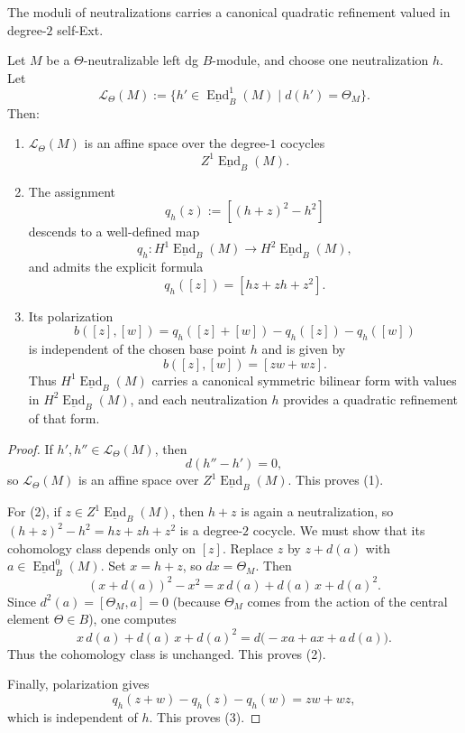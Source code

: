 The moduli of neutralizations carries a canonical quadratic refinement valued in degree-\(2\) self-Ext.

\begin{theorem}
\label{thm:tholog-quadratic-refinement}
Let \(M\) be a \(\Theta\)-neutralizable left dg \(B\)-module, and choose one neutralization \(h\).
Let
\[
\mathcal{L}_{\Theta}(M)
:=
\big\{
h'\in \underline{\operatorname{End}}^{1}_{B}(M)\;\big|\;
d(h')=\Theta_{M}
\big\}.
\]
Then:
\begin{enumerate}
\item \(\mathcal{L}_{\Theta}(M)\) is an affine space over the degree-\(1\) cocycles
\[
Z^{1}\underline{\operatorname{End}}_{B}(M).
\]
\item The assignment
\[
q_{h}(z):=[(h+z)^{2}-h^{2}]
\]
descends to a well-defined map
\[
q_{h}:H^{1}\underline{\operatorname{End}}_{B}(M)\longrightarrow
H^{2}\underline{\operatorname{End}}_{B}(M),
\]
and admits the explicit formula
\[
q_{h}([z])=[hz+zh+z^{2}].
\]
\item Its polarization
\[
b([z],[w])
=
q_{h}([z]+[w])-q_{h}([z])-q_{h}([w])
\]
is independent of the chosen base point \(h\) and is given by
\[
b([z],[w])=[zw+wz].
\]
Thus \(H^{1}\underline{\operatorname{End}}_{B}(M)\) carries a canonical symmetric bilinear form with values in \(H^{2}\underline{\operatorname{End}}_{B}(M)\), and each neutralization \(h\) provides a quadratic refinement of that form.
\end{enumerate}
\end{theorem}

\begin{proof}
If \(h',h''\in \mathcal{L}_{\Theta}(M)\), then
\[
d(h''-h')=0,
\]
so \(\mathcal{L}_{\Theta}(M)\) is an affine space over \(Z^{1}\underline{\operatorname{End}}_{B}(M)\).
This proves (1).

For (2), if \(z\in Z^{1}\underline{\operatorname{End}}_{B}(M)\), then \(h+z\) is again a neutralization, so \((h+z)^{2}-h^{2}=hz+zh+z^{2}\) is a degree-\(2\) cocycle.
We must show that its cohomology class depends only on \([z]\).
Replace \(z\) by \(z+d(a)\) with \(a\in \underline{\operatorname{End}}^{0}_{B}(M)\).
Set \(x=h+z\), so \(dx=\Theta_{M}\).
Then
\[
(x+d(a))^{2}-x^{2}=x\,d(a)+d(a)\,x+d(a)^{2}.
\]
Since \(d^{2}(a)=[\Theta_{M},a]=0\) (because \(\Theta_{M}\) comes from the action of the central element \(\Theta\in B\)), one computes
\[
x\,d(a)+d(a)\,x+d(a)^{2}
=
d\big(-xa+ax+a\,d(a)\big).
\]
Thus the cohomology class is unchanged.
This proves (2).

Finally, polarization gives
\[
q_{h}(z+w)-q_{h}(z)-q_{h}(w)=zw+wz,
\]
which is independent of \(h\).
This proves (3).
\end{proof}

